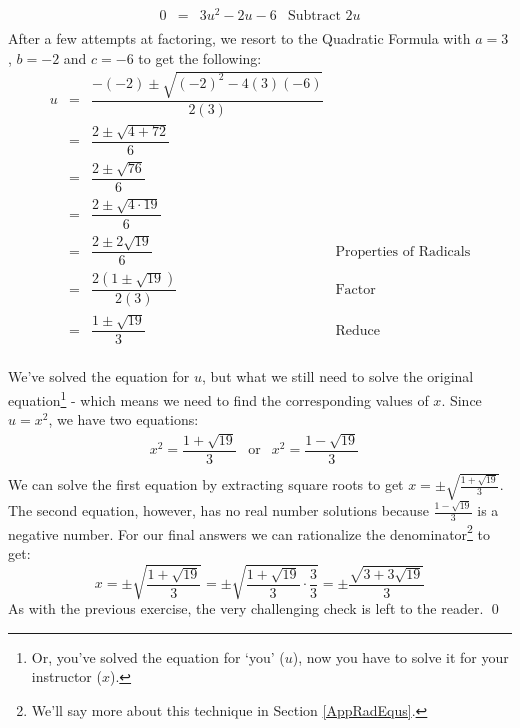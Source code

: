 \documentclass{ximera}
\begin{document}
\begin{ex}
\begin{enumerate}
\[\begin{array}{rclr}
0 & = & 3u^2 - 2u - 6 & \text{Subtract $2u$} \\

\end{array}\] After a few attempts at factoring, we resort to the Quadratic Formula with $a = 3$, $b = -2$ and $c = -6$ to get the following:\[ \begin{array}{rclr}

u & = & \dfrac{-(-2) \pm \sqrt{(-2)^2 - 4(3)(-6)}}{2(3)} & \\ [10pt]

& = & \dfrac{2 \pm \sqrt{4 + 72}}{6} & \\ [10pt]

& = & \dfrac{2 \pm \sqrt{76}}{6} & \\ [10pt]

& = & \dfrac{2 \pm \sqrt{4 \cdot 19}}{6} & \\ [10pt]

& = & \dfrac{2 \pm 2\sqrt{19}}{6} & \text{Properties of Radicals} \\ [10pt]

& = & \dfrac{2(1 \pm \sqrt{19})}{2(3)} & \text{Factor} \\ [10pt]

& = & \dfrac{1 \pm \sqrt{19}}{3} & \text{Reduce} \\

\end{array} \]

We've solved the equation for $u$, but what we still need to solve the original equation\footnote{Or, you've solved the equation for `you' ($u$), now you have to solve it for your instructor ($x$).} - which means we need to find the corresponding values of $x$.  Since $u = x^2$, we have two equations:\[ \begin{array}{rclr}  

x^2  =\dfrac{1 + \sqrt{19}}{3} & \text{or} & x^2  =\dfrac{1 - \sqrt{19}}{3} & \\

\end{array}\] We can solve the first equation by extracting square roots to get  $x = \pm \sqrt{\frac{1 + \sqrt{19}}{3}}$.  The second equation, however, has no real number solutions because $\frac{1 - \sqrt{19}}{3}$ is a negative number.  For our final answers we can rationalize the denominator\footnote{We'll say more about this technique in Section \ref{AppRadEqus}.} to get: \[ x = \pm \sqrt{\dfrac{1 + \sqrt{19}}{3}} = \pm \sqrt{\dfrac{1 + \sqrt{19}}{3} \cdot \dfrac{3}{3}} = \pm \dfrac{\sqrt{3 + 3\sqrt{19}}}{3} \] As with the previous exercise, the very challenging check is left to the reader. \qed

\end{enumerate}

\end{ex}
\end{document}
